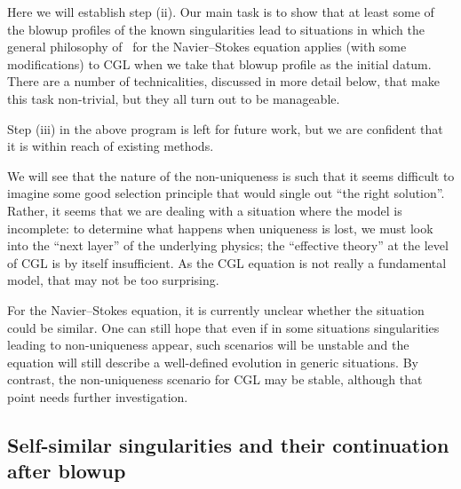 \documentclass[11pt]{article}
\begin{document}
Here we will establish step (ii). Our main task is to show that at
least some of the blowup profiles of the known singularities lead to
situations in which the general philosophy of~\cite{Jia2015} for the
Navier--Stokes equation applies (with some modifications) to CGL when
we take that blowup profile as the initial datum. There are a number
of technicalities, discussed in more detail below, that make this task
non-trivial, but they all turn out to be manageable.

Step (iii) in the above program is left for future work, but we are
confident that it is within reach of existing methods.

We will see that the nature of the non-uniqueness is such that it
seems difficult to imagine some good selection principle that would
single out ``the right solution''. Rather, it seems that we are
dealing with a situation where the model is incomplete: to determine
what happens when uniqueness is lost, we must look into the ``next
layer'' of the underlying physics; the ``effective theory'' at the
level of CGL is by itself insufficient. As the CGL equation is not
really a fundamental model, that may not be too surprising.

For the Navier--Stokes equation, it is currently unclear whether the
situation could be similar. One can still hope that even if in some
situations singularities leading to non-uniqueness appear, such
scenarios will be unstable and the equation will still describe a
well-defined evolution in generic situations. By contrast, the
non-uniqueness scenario for CGL may be stable, although that point
needs further investigation.

\subsection{Self-similar singularities and their continuation after blowup}
\end{document}
